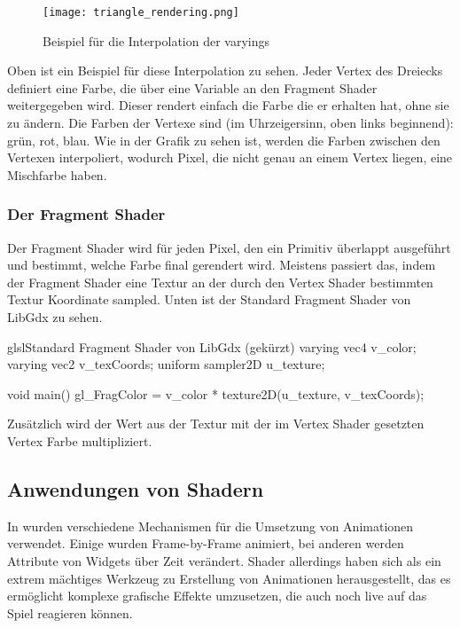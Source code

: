 \begin{figure}[H]
    \centering
    \texttt{[image: triangle\_rendering.png]}
    \caption{Beispiel für die Interpolation der varyings}
\end{figure}

Oben ist ein Beispiel für diese Interpolation zu sehen.
Jeder Vertex des Dreiecks definiert eine Farbe, die über eine  Variable an den Fragment Shader
weitergegeben wird.
Dieser rendert einfach die Farbe die er erhalten hat, ohne sie zu ändern.
Die Farben der Vertexe sind (im Uhrzeigersinn, oben links beginnend): grün, rot, blau.
Wie in der Grafik zu sehen ist, werden die Farben zwischen den Vertexen interpoliert, wodurch Pixel, die nicht genau
an einem Vertex liegen, eine Mischfarbe haben.

\subsubsection{Der Fragment Shader}

Der Fragment Shader wird für jeden Pixel, den ein Primitiv überlappt ausgeführt und bestimmt, welche Farbe final
gerendert wird.
Meistens passiert das, indem der Fragment Shader eine Textur an der durch den Vertex Shader bestimmten Textur
Koordinate sampled.
Unten ist der Standard Fragment Shader von LibGdx zu sehen.

\begin{codeBlock}{glsl}{Standard Fragment Shader von LibGdx (gekürzt)}
varying vec4 v_color;
varying vec2 v_texCoords;
uniform sampler2D u_texture;

void main() {
    gl_FragColor = v_color * texture2D(u_texture, v_texCoords);
}
\end{codeBlock}

Zusätzlich wird der Wert aus der Textur mit der im Vertex Shader gesetzten Vertex Farbe multipliziert.\cite{openglFragmentShader}

\subsection{Anwendungen von Shadern}

In \FF wurden verschiedene Mechanismen für die Umsetzung von Animationen verwendet.
Einige wurden Frame-by-Frame animiert, bei anderen werden Attribute von Widgets über Zeit verändert.
Shader allerdings haben sich als ein extrem mächtiges Werkzeug zu Erstellung von Animationen herausgestellt, das es
ermöglicht komplexe grafische Effekte umzusetzen, die auch noch live auf das Spiel reagieren können.

